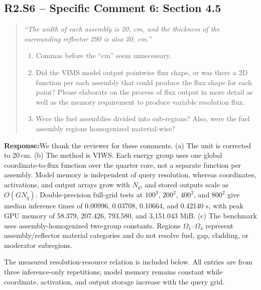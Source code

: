 \documentclass[11pt,a4paper]{article}
\newenvironment{reviewercomment}{\begin{quote}\small\itshape\color{commentgray}}{\end{quote}}
\newcommand{\authorresponse}{\noindent\textbf{Response:}\quad}
\begin{document}
\subsection*{R2.S6 -- Specific Comment 6: Section 4.5}
\begin{reviewercomment}
``The width of each assembly is 20, cm, and the thickness of the surrounding reflector 290 is also 20, cm.''

\begin{enumerate}[label=\alph*.,leftmargin=2em]
\item Commas before the ``cm'' seem unnecessary.
\item Did the VIMS model output pointwise flux shape, or was there a 2D function per each assembly that could produce the flux shape for each point? Please elaborate on the process of flux output in more detail as well as the memory requirement to produce variable resolution flux.
\item Were the fuel assemblies divided into sub-regions? Also, were the fuel assembly regions homogenized material-wise?
\end{enumerate}
\end{reviewercomment}
\authorresponse We thank the reviewer for these comments. (a) The unit is corrected to $20\,\mathrm{cm}$. (b) The method is VIWS. Each energy group uses one global coordinate-to-flux function over the quarter core, not a separate function per assembly. Model memory is independent of query resolution, whereas coordinates, activations, and output arrays grow with $N_q$, and stored outputs scale as $O(GN_q)$. Double-precision full-grid tests at $100^2$, $200^2$, $400^2$, and $800^2$ give median inference times of 0.00996, 0.03708, 0.10664, and 0.42140 s, with peak GPU memory of 58.379, 207.426, 793.580, and 3,151.043 MiB. (c) The benchmark uses assembly-homogenized two-group constants. Regions $\Omega_1$--$\Omega_4$ represent assembly/reflector material categories and do not resolve fuel, gap, cladding, or moderator subregions.

The measured resolution-resource relation is included below. All entries are from three inference-only repetitions; model memory remains constant while coordinate, activation, and output storage increase with the query grid.
\end{document}
